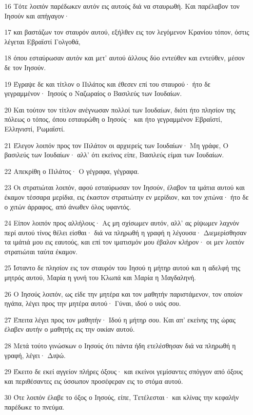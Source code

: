 \par 16 Τότε λοιπόν παρέδωκεν αυτόν εις αυτούς διά να σταυρωθή. Και παρέλαβον τον Ιησούν και απήγαγον·
\par 17 και βαστάζων τον σταυρόν αυτού, εξήλθεν εις τον λεγόμενον Κρανίου τόπον, όστις λέγεται Εβραϊστί Γολγοθά,
\par 18 όπου εσταύρωσαν αυτόν και μετ' αυτού άλλους δύο εντεύθεν και εντεύθεν, μέσον δε τον Ιησούν.
\par 19 Έγραψε δε και τίτλον ο Πιλάτος και έθεσεν επί του σταυρού· ήτο δε γεγραμμένον· Ιησούς ο Ναζωραίος ο Βασιλεύς των Ιουδαίων.
\par 20 Και τούτον τον τίτλον ανέγνωσαν πολλοί των Ιουδαίων, διότι ήτο πλησίον της πόλεως ο τόπος, όπου εσταυρώθη ο Ιησούς· και ήτο γεγραμμένον Εβραϊστί, Ελληνιστί, Ρωμαϊστί.
\par 21 Έλεγον λοιπόν προς τον Πιλάτον οι αρχιερείς των Ιουδαίων· Μη γράφε, Ο βασιλεύς των Ιουδαίων· αλλ' ότι εκείνος είπε, Βασιλεύς είμαι των Ιουδαίων.
\par 22 Απεκρίθη ο Πιλάτος· Ο γέγραφα, γέγραφα.
\par 23 Οι στρατιώται λοιπόν, αφού εσταύρωσαν τον Ιησούν, έλαβον τα ιμάτια αυτού και έκαμον τέσσαρα μερίδια, εις έκαστον στρατιώτην εν μερίδιον, και τον χιτώνα· ήτο δε ο χιτών άρραφος, από άνωθεν όλος υφαντός.
\par 24 Είπον λοιπόν προς αλλήλους· Ας μη σχίσωμεν αυτόν, αλλ' ας ρίψωμεν λαχνόν περί αυτού τίνος θέλει είσθαι· διά να πληρωθή η γραφή η λέγουσα· Διεμερίσθησαν τα ιμάτιά μου εις εαυτούς, και επί τον ιματισμόν μου έβαλον κλήρον· οι μεν λοιπόν στρατιώται ταύτα έκαμον.
\par 25 Ίσταντο δε πλησίον εις τον σταυρόν του Ιησού η μήτηρ αυτού και η αδελφή της μητρός αυτού, Μαρία η γυνή του Κλωπά και Μαρία η Μαγδαληνή.
\par 26 Ο Ιησούς λοιπόν, ως είδε την μητέρα και τον μαθητήν παριστάμενον, τον οποίον ηγάπα, λέγει προς την μητέρα αυτού· Γύναι, ιδού ο υιός σου.
\par 27 Έπειτα λέγει προς τον μαθητήν· Ιδού η μήτηρ σου. Και απ' εκείνης της ώρας έλαβεν αυτήν ο μαθητής εις την οικίαν αυτού.
\par 28 Μετά τούτο γινώσκων ο Ιησούς ότι πάντα ήδη ετελέσθησαν διά να πληρωθή η γραφή, λέγει· Διψώ.
\par 29 Έκειτο δε εκεί αγγείον πλήρες όξους· και εκείνοι γεμίσαντες σπόγγον από όξους και περιθέσαντες εις ύσσωπον προσέφεραν εις το στόμα αυτού.
\par 30 Ότε λοιπόν έλαβε το όξος ο Ιησούς, είπε, Τετέλεσται· και κλίνας την κεφαλήν παρέδωκε το πνεύμα.
